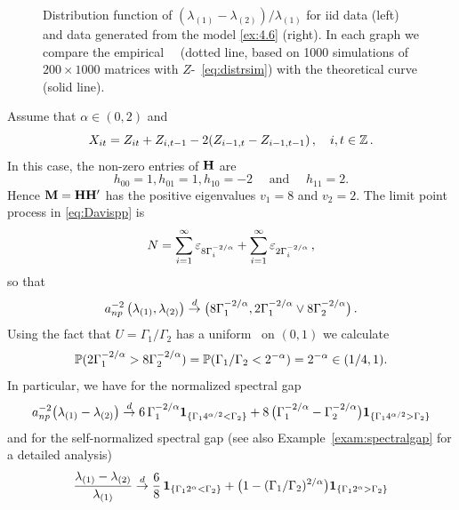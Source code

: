 \begin{example}
\begin{figure}[htb!]
{  }
  \caption{Distribution function of $(\lambda_{(1)} - \lambda_{(2)})/\lambda_{(1)}$ for iid data (left) and
    data generated from the model \eqref{ex:4.6} (right). In each graph we compare the empirical \ds\ \fct\
(dotted line, based on
1000 simulations of $200 \times 1000$ matrices with $Z$-\ds\ \eqref{eq:distrsim}) with the theoretical curve (solid line).}
  \label{fig:ProbMass}
\end{figure}
Assume that $\alpha\in (0,2)$ and
\begin{equation}\label{ex:4.6}
X_{it}= Z_{it}+ Z_{i,t-1}-2 (Z_{i-1,t}- Z_{i-1,t-1})\,,\quad i,t\in\Z\,.
\end{equation}
In this case, the non-zero entries of $\H$ are
\begin{equation*}
h_{00}=1, h_{01}=1,h_{10}=-2 \quad \mbox{ and }\quad h_{11}=2.
\end{equation*}
Hence $\M=\H\H'$ has the positive eigenvalues
$v_1=8$ and $v_2=2$. The limit point process in \eqref{eq:Davispp} is
\begin{equation*}
N=\sum_{i=1}^\infty \vep_{8\Gamma_i^{-2/\alpha}}+ \sum_{i=1}^\infty \vep_{2\Gamma_i^{-2/\alpha}}\,,
\end{equation*}
so that
\begin{equation*}
a_{np}^{-2}\,\big(\la_{(1)},\la_{(2)}\big) \cid
\big(8\Gamma_{1}^{-2/\alpha}, 2\Gamma_1^{-2/\alpha}\vee 8
\Gamma_2^{-2/\alpha}\big)\,.
\end{equation*}
Using the fact that $U=\Gamma_1/\Gamma_2$ has a uniform \ds\ on $(0,1)$ we calculate
\begin{equation*}
\P(2\Gamma_1^{-2/\alpha}>8\Gamma_2^{-2/\alpha})= \P(\Gamma_1/\Gamma_2<2^{-\alpha})= 2^{-\alpha} \in (1/4,1).
\end{equation*}
In particular, we have for the normalized spectral gap
\begin{equation*}
a_{np}^{-2} \big(\la_{(1)}-\la_{(2)}\big)\cid
6 \,\Gamma_1^{-2/\alpha} \I_{\{\Gamma_1 4^{\alpha/2 }<\Gamma_2\}}+
8\,
\big(\Gamma_1^{-2/\alpha}-\Gamma_2^{-2/\alpha}\big)\I_{\{\Gamma_14^{\alpha/2
  }> \Gamma_2\}}
\end{equation*}
and for the self-normalized spectral gap (see also Example~\ref{exam:spectralgap} for a detailed analysis)
\begin{equation*}
\begin{split}
\dfrac{\la_{(1)}-\la_{(2)}}{\la_{(1)}}&\cid
\dfrac{6}{8} \, \I_{\{\Gamma_1 2^{\alpha }<\Gamma_2\}}+
\big(1-(\Gamma_1/\Gamma_2)^{2/\alpha}\big)\I_{\{\Gamma_12^{\alpha
  }> \Gamma_2\}}\\

\end{split}
\end{equation*}
\end{example}
